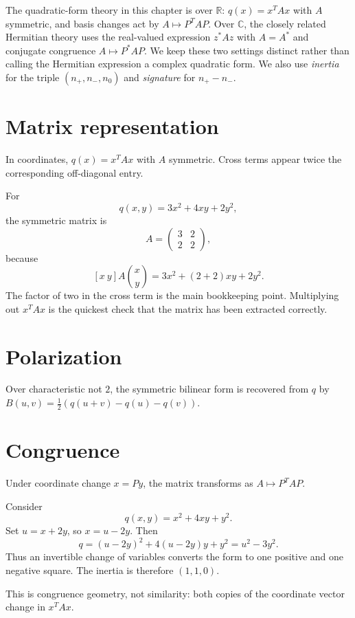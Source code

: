 \begin{remark}
The quadratic-form theory in this chapter is over \(\mathbb R\):
\(q(x)=x^TAx\) with \(A\) symmetric, and basis changes act by
\(A\mapsto P^TAP\). Over \(\mathbb C\), the closely related Hermitian theory
uses the real-valued expression \(z^*Az\) with \(A=A^*\) and conjugate
congruence \(A\mapsto P^*AP\). We keep these two settings distinct rather than
calling the Hermitian expression a complex quadratic form. We also use
\emph{inertia} for the triple \((n_+,n_-,n_0)\) and \emph{signature} for
\(n_+-n_-\).
\end{remark}

\section{Matrix representation}
In coordinates, $q(x)=x^TAx$ with $A$ symmetric. Cross terms appear twice the corresponding off-diagonal entry.


\begin{example}\label{ex:i17-expand-01}
For
\[
q(x,y)=3x^2+4xy+2y^2,
\]
the symmetric matrix is
\[
A=\begin{pmatrix}3&2\\2&2\end{pmatrix},
\]
because
\[
[x\ y]A\binom{x}{y}=3x^2+(2+2)xy+2y^2.
\]
The factor of two in the cross term is the main bookkeeping point. Multiplying
out \(x^TAx\) is the quickest check that the matrix has been extracted
correctly.
\end{example}
\section{Polarization}
Over characteristic not $2$, the symmetric bilinear form is recovered from $q$ by $B(u,v)=\tfrac12(q(u+v)-q(u)-q(v))$.

\section{Congruence}
Under coordinate change $x=Py$, the matrix transforms as $A\mapsto P^TAP$.


\begin{example}\label{ex:i17-expand-02}
Consider
\[
q(x,y)=x^2+4xy+y^2.
\]
Set \(u=x+2y\), so \(x=u-2y\). Then
\[
q=(u-2y)^2+4(u-2y)y+y^2=u^2-3y^2.
\]
Thus an invertible change of variables converts the form to one positive and
one negative square. The inertia is therefore \((1,1,0)\).

This is congruence geometry, not similarity: both copies of the coordinate
vector change in \(x^TAx\).
\end{example}
